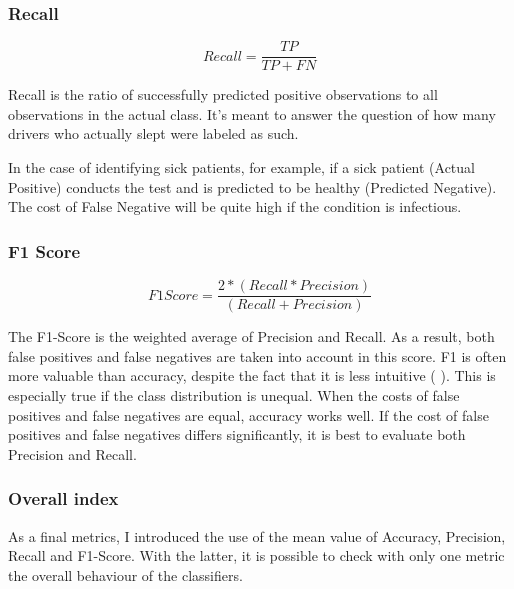 \subsubsection{Recall} \label{4recall}
\begin{equation}
    Recall = \frac{TP}{TP+FN}
\end{equation}

Recall \cite{metrics2} is the ratio of successfully predicted positive observations to all observations in the actual class. It's meant to answer the question of how many drivers who actually slept were labeled as such.

In the case of identifying sick patients, for example, if a sick patient (Actual Positive) conducts the test and is predicted to be healthy (Predicted Negative). The cost of False Negative will be quite high if the condition is infectious.

\subsubsection{F1 Score} \label{4F1}
\begin{equation}
    F1 Score = \frac{2*(Recall * Precision)}{(Recall + Precision)}
\end{equation}

The F1-Score is the weighted average of Precision and Recall. As a result, both false positives and false negatives are taken into account in this score. F1 is often more valuable than accuracy, despite the fact that it is less intuitive (\cite{metrics1} \cite{metrics2}). This is especially true if the class distribution is unequal. When the costs of false positives and false negatives are equal, accuracy works well. If the cost of false positives and false negatives differs significantly, it is best to evaluate both Precision and Recall.

\subsubsection{Overall index} \label{4overallindex}

As a final metrics, I introduced the use of the mean value of Accuracy, Precision, Recall and F1-Score. With the latter, it is possible to check with only one metric the overall behaviour of the classifiers.


